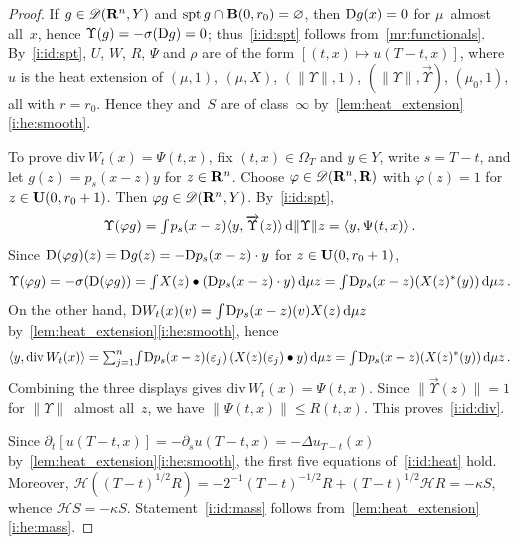 \documentclass[a4paper,twoside,leqno]{article}
\newcommand{\heatop}{\mathcal{H}}          %
\newcommand{\dUps}{\overrightarrow{\Upsilon}} %
\begin{document}
\begin{proof}
    If $g \in \mathscr{D}(\mathbf{R}^{n},Y)$ and $\operatorname{spt} g \cap \mathbf{B}(0,r_0) = \varnothing$, then $\mathrm{D}
    g(x) = 0$ for $\mu$~almost all~$x$, hence $\Upsilon(g) = -\sigma(\mathrm{D} g) = 0$;
    thus~\ref{i:id:spt} follows from~\ref{mr:functionals}. By~\ref{i:id:spt}, $U$, $W$, $R$,
    $\Psi$ and $\rho$ are of the form $[(t,x) \mapsto u(T-t,x)]$, where $u$ is the heat extension
    of $(\mu,1)$, $(\mu,X)$, $(\|\Upsilon\|,1)$, $(\|\Upsilon\|,\dUps)$, $(\mu_0,1)$, all with
    $r = r_0$. Hence they and~$S$ are of class~$\infty$ by~\ref{lem:heat_extension}\ref{i:he:smooth}.

    To prove $\mathrm{div}\, W_t(x) = \Psi(t,x)$, fix $(t,x) \in \Omega_T$ and $y \in Y$, write $s
    = T - t$, and let $g(z) = p_s(x-z) y$ for $z \in \mathbf{R}^{n}$. Choose $\varphi \in
    \mathscr{D}(\mathbf{R}^{n},\mathbf{R})$ with $\varphi(z) = 1$ for $z \in \mathbf{U}(0,r_0 + 1)$. Then $\varphi g
    \in \mathscr{D}(\mathbf{R}^{n},Y)$. By~\ref{i:id:spt},
    \begin{displaymath}
        \Upsilon(\varphi g) = \textint{}{} p_s(x-z) \langle y, \dUps(z) \rangle \ud \|\Upsilon\| z
        = \langle y, \Psi(t,x) \rangle \,.
    \end{displaymath}
    Since $\mathrm{D}(\varphi g)(z) = \mathrm{D} g(z) = - \mathrm{D} p_s(x-z) \cdot y$ for $z \in \mathbf{U}(0,r_0 + 1)$,
    \begin{displaymath}
        \Upsilon(\varphi g) = - \sigma(\mathrm{D}(\varphi g)) = {\textstyle\int_{}^{}} X(z) \bullet (\mathrm{D} p_s(x-z)
        \cdot y) \,\mathrm{d} \mu z = {\textstyle\int_{}^{}} \mathrm{D} p_s(x-z)(X(z)^{*}(y)) \,\mathrm{d} \mu z \,.
    \end{displaymath}
    On the other hand, $\mathrm{D} W_t(x)(v) = {\textstyle\int_{}^{}} \mathrm{D} p_s(x-z)(v) X(z) \,\mathrm{d} \mu z$
    by~\ref{lem:heat_extension}\ref{i:he:smooth}, hence
    \begin{displaymath}
        \langle y, \mathrm{div}\, W_t(x) \rangle = {\textstyle\sum_{j=1}^{n}} {\textstyle\int_{}^{}} \mathrm{D}
        p_s(x-z)(\varepsilon_j) \, (X(z)(\varepsilon_j) \bullet y) \,\mathrm{d} \mu z = {\textstyle\int_{}^{}} \mathrm{D}
        p_s(x-z)(X(z)^{*}(y)) \,\mathrm{d} \mu z \,.
    \end{displaymath}
    Combining the three displays gives $\mathrm{div}\, W_t(x) = \Psi(t,x)$. Since $\|\dUps(z)\| = 1$
    for $\|\Upsilon\|$~almost all~$z$, we have $\|\Psi(t,x)\| \le R(t,x)$. This
    proves~\ref{i:id:div}.

    Since $\partial_t [u(T-t,x)] = - \partial_s u(T-t,x) = - \Delta u_{T-t}(x)$
    by~\ref{lem:heat_extension}\ref{i:he:smooth}, the first five equations of~\ref{i:id:heat} hold.
    Moreover, $\heatop((T-t)^{1/2} R) = -2^{-1} (T-t)^{-1/2} R + (T-t)^{1/2} \heatop R = - \kappa
    S$, whence $\heatop S = -\kappa S$. Statement~\ref{i:id:mass} follows
    from~\ref{lem:heat_extension}\ref{i:he:mass}.


\end{proof}
\end{document}
